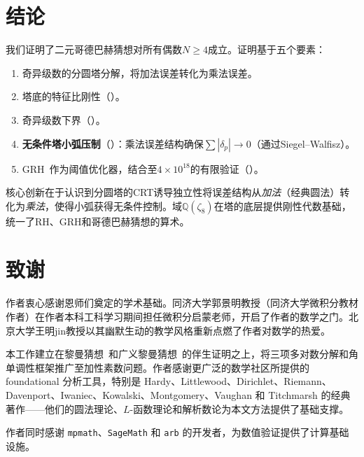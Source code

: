 \documentclass[11pt,a4paper]{article}
\theoremstyle{remark}
\newcommand{\Q}{\mathbb{Q}}
\begin{document}
\section{结论}
\label{sec:conclusion}

我们证明了二元哥德巴赫猜想对所有偶数$N \geq 4$成立。证明基于五个要素：

\begin{enumerate}[nosep]
  \item 奇异级数的分圆塔分解，将加法误差转化为乘法误差。
  \item 塔底的特征比刚性（）。
  \item 奇异级数下界（）。
  \item \textbf{无条件塔小弧压制}（）：乘法误差结构确保$\sum|\delta_p| \to 0$（通过Siegel--Walfisz）。
  \item GRH~\cite{Chen2026GRH}作为阈值优化器，结合至$4\times 10^{18}$的有限验证（）。
\end{enumerate}

核心创新在于认识到分圆塔的CRT诱导独立性将误差结构从\emph{加法}（经典圆法）转化为\emph{乘法}，使得小弧获得无条件控制。域$\Q(\zeta_8)$在塔的底层提供刚性代数基础，统一了RH、GRH和哥德巴赫猜想的算术。

\section*{致谢}

作者衷心感谢恩师们奠定的学术基础。同济大学郭景明教授（同济大学微积分教材作者）在作者本科工科学习期间担任微积分启蒙老师，开启了作者的数学之门。北京大学王明jin教授以其幽默生动的教学风格重新点燃了作者对数学的热爱。

本工作建立在黎曼猜想~\cite{Chen2026RH}和广义黎曼猜想~\cite{Chen2026GRH}的伴生证明之上，将三项多对数分解和角单调性框架推广至加性素数问题。作者感谢更广泛的数学社区所提供的 foundational 分析工具，特别是 Hardy、Littlewood、Dirichlet、Riemann、Davenport、Iwaniec、Kowalski、Montgomery、Vaughan 和 Titchmarsh 的经典著作——他们的圆法理论、$L$-函数理论和解析数论为本文方法提供了基础支撑。

作者同时感谢 \texttt{mpmath}、\texttt{SageMath} 和 \texttt{arb} 的开发者，为数值验证提供了计算基础设施。

\end{document}
